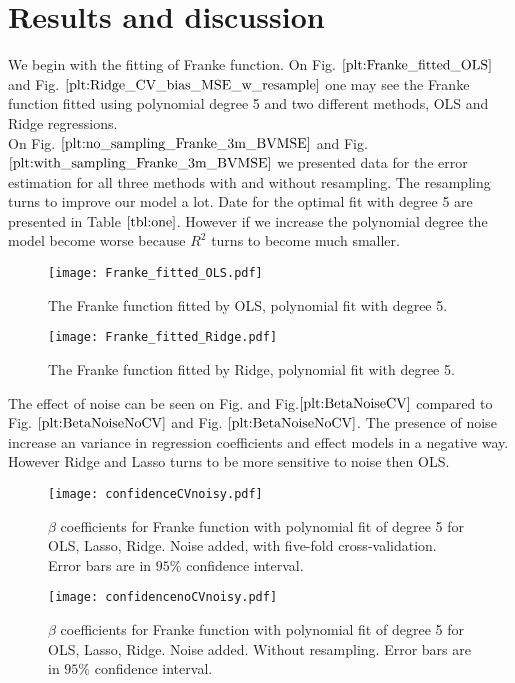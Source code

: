 \documentclass[10pt]{article}
\begin{document}
\section{Results and discussion} \label{Results}
We begin with the fitting of Franke function. On Fig. $\ref{plt:Franke_fitted_OLS}$ and Fig. $\ref{plt:Ridge_CV_bias_MSE_w_resample}$ one may see the Franke function fitted using polynomial degree 5 and two different methods, OLS and Ridge regressions.   \\
On Fig. $\ref{plt:no_sampling_Franke_3m_BVMSE}$ and Fig. $\ref{plt:with_sampling_Franke_3m_BVMSE}$ we presented data for the error estimation for all three methods with and without resampling. The resampling turns to improve our model a lot. Date for the optimal fit with degree 5 are presented in Table $\ref{tbl:one}$. However if we increase the polynomial degree the model become worse because $R^2$ turns to become much smaller.\\

\begin{figure}
	\centerline{\texttt{[image: Franke\_fitted\_OLS.pdf]}}
	\caption{The  Franke function fitted by OLS, polynomial fit with degree 5.} \label{plt:Franke_fitted_OLS}
\end{figure}

\begin{figure}
	\centerline{\texttt{[image: Franke\_fitted\_Ridge.pdf]}}
	\caption{The  Franke function fitted by Ridge, polynomial fit with degree 5.} \label{plt:Franke_fitted_Ridge}
\end{figure}
\newpage
The effect of noise can be seen on Fig. and Fig.$\ref{plt:BetaNoiseCV}$ compared to Fig. $\ref{plt:BetaNoiseNoCV}$ and Fig. $\ref{plt:BetaNoiseNoCV}$. The presence of noise increase an variance in regression coefficients and effect models in a negative way. However Ridge and Lasso turns to be more sensitive to noise then OLS.


\begin{figure}
	\centerline{\texttt{[image: confidenceCVnoisy.pdf]}}
	\caption{$\beta$ coefficients for Franke function with polynomial fit of degree 5 for OLS, Lasso, Ridge. Noise added, with five-fold cross-validation. Error bars are in $95\%$ confidence interval.}
	\label{plt:BetaNoiseCV}
\end{figure}

\begin{figure}
	\centerline{\texttt{[image: confidencenoCVnoisy.pdf]}}
	\caption{$\beta$ coefficients for Franke function with polynomial fit of degree 5 for OLS, Lasso, Ridge. Noise added. Without resampling. Error bars are in $95\%$ confidence interval.}
	\label{plt:BetaNoiseNoCV}
\end{figure}
\end{document}
